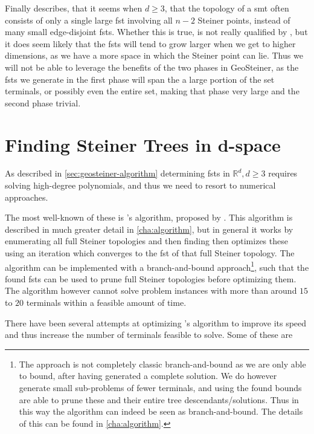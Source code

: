 Finally \textcite[p.~142]{smith1992} describes, that it seems when $d \ge 3$,
that the topology of a \ac{smt} often consists of only a single large \ac{fst}
involving all $n-2$ Steiner points, instead of many small edge-disjoint
\acp{fst}. Whether this is true, is not really qualified by
\textcite{smith1992}, but it does seem likely that the \acp{fst} will tend to
grow larger when we get to higher dimensions, as we have a more space in which
the Steiner point can lie. Thus we will not be able to leverage the benefits of
the two phases in GeoSteiner, as the \acp{fst} we generate in the first phase
will span the a large portion of the set terminals, or possibly even the entire
set, making that phase very large and the second phase trivial.

\section{Finding Steiner Trees in d-space}
\label{sec:find-stein-trees-d}

As described in \cref{sec:geosteiner-algorithm} determining \acp{fst} in
$\mathbb{R}^d, d \ge 3$ requires solving high-degree polynomials, and thus we
need to resort to numerical approaches.

The most well-known of these is \citeauthor{smith1992}'s algorithm, proposed by
\textcite{smith1992}. This algorithm is described in much greater detail in
\cref{cha:algorithm}, but in general it works by enumerating all full Steiner
topologies and then finding then optimizes these using an iteration which
converges to the \ac{fst} of that full Steiner topology. The algorithm can be
implemented with a branch-and-bound approach\footnote{The approach is not
  completely classic branch-and-bound as we are only able to bound, after having
  generated a complete solution. We do however generate small sub-problems of
  fewer terminals, and using the found bounds are able to prune these and their
  entire tree descendants/solutions. Thus in this way the algorithm can indeed
  be seen as branch-and-bound. The details of this can be found in
  \cref{cha:algorithm}.}, such that the found \acp{fst} can be used to prune
full Steiner topologies before optimizing them. The algorithm however cannot
solve problem instances with more than around $15$ to $20$ terminals within a
feasible amount of time.

There have been several attempts at optimizing \citeauthor{smith1992}'s
algorithm to improve its speed and thus increase the number of terminals
feasible to solve. Some of these are

